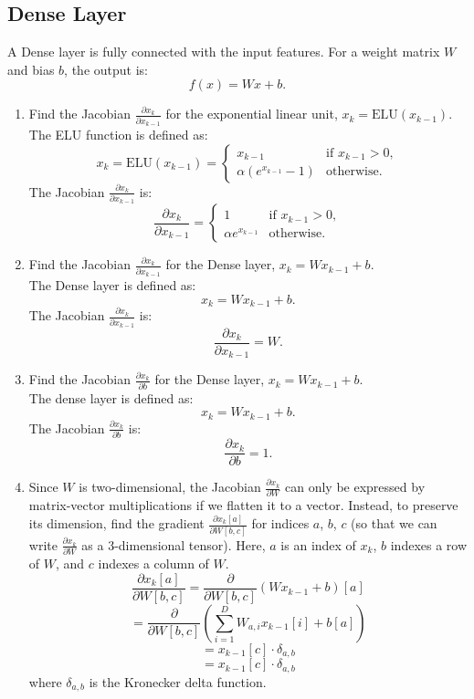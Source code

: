 \documentclass[a3paper,12pt]{extarticle} %
\begin{document}
\subsection*{Dense Layer}
A Dense layer is fully connected with the input features. For a weight matrix $W$ and bias $b$, the output is:
\[
f(x) = Wx + b.
\]
\begin{enumerate}
    \item 
    Find the Jacobian $\frac{\partial x_k}{\partial x_{k-1}}$ for the exponential linear unit, $x_k = \text{ELU}(x_{k-1})$.
    \\ The ELU function is defined as:
    \[
    x_k = \text{ELU}(x_{k-1}) =
    \begin{cases}
    x_{k-1} & \text{if } x_{k-1} > 0, \\
    \alpha(e^{x_{k-1}} - 1) & \text{otherwise}.
    \end{cases}
    \]
    The Jacobian $\frac{\partial x_k}{\partial x_{k-1}}$ is:
    \[
    \frac{\partial x_k}{\partial x_{k-1}} =
    \begin{cases}
    1 & \text{if } x_{k-1} > 0, \\
    \alpha e^{x_{k-1}} & \text{otherwise}.
    \end{cases}
    \]
    \item
    Find the Jacobian $\frac{\partial x_k}{\partial x_{k-1}}$ for the Dense layer, $x_k = Wx_{k-1} + b$.
    \\ The Dense layer is defined as:
    \[
    x_k = Wx_{k-1} + b.
    \]
    The Jacobian $\frac{\partial x_k}{\partial x_{k-1}}$ is:
    \[
    \frac{\partial x_k}{\partial x_{k-1}} = W.
    \]
    \item 
    Find the Jacobian $\frac{\partial x_k}{\partial b}$ for the Dense layer, $x_k = Wx_{k-1} + b$.
    \\ The dense layer is defined as:
    \[
    x_k = Wx_{k-1} + b.
    \]
    The Jacobian $\frac{\partial x_k}{\partial b}$ is:
    \[
    \frac{\partial x_k}{\partial b} = 1.
    \]
    \item Since $W$ is two-dimensional, the Jacobian $\frac{\partial x_k}{\partial W}$ can only be expressed by matrix-vector multiplications if we flatten it to a vector. Instead, to preserve its dimension, find the gradient $\frac{\partial x_k[a]}{\partial W[b,c]}$ for indices $a$, $b$, $c$ (so that we can write $\frac{\partial x_k}{\partial W}$ as a 3-dimensional tensor). Here, $a$ is an index of $x_k$, $b$ indexes a row of $W$, and $c$ indexes a column of $W$.
    \[
    \frac{\partial x_k[a]}{\partial W[b,c]} = \frac{\partial}{\partial W[b,c]} \left( Wx_{k-1} + b \right)[a]
    \]
    \[
    = \frac{\partial}{\partial W[b,c]} \left( \sum_{i=1}^D W_{a,i} x_{k-1}[i] + b[a] \right)
    \]
    \[
    = x_{k-1}[c] \cdot \delta_{a,b}
    \]
    \[
    = x_{k-1}[c] \cdot \delta_{a,b}
    \]
    where $\delta_{a,b}$ is the Kronecker delta function.
    
\end{enumerate}
\end{document}
